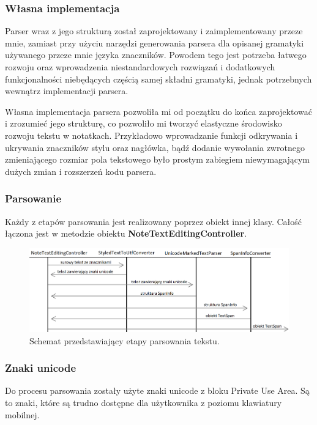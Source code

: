 \subsubsection{Własna implementacja}

Parser wraz z jego strukturą został zaprojektowany i zaimplementowany przeze mnie, zamiast przy użyciu narzędzi generowania parsera dla opisanej gramatyki używanego przeze mnie języka znaczników. Powodem tego jest potrzeba łatwego rozwoju oraz wprowadzenia niestandardowych rozwiązań i dodatkowych funkcjonalności niebędących częścią samej składni gramatyki, jednak potrzebnych wewnątrz implementacji parsera.

Własna implementacja parsera pozwoliła mi od początku do końca zaprojektować i zrozumieć jego strukturę, co pozwoliło mi tworzyć elastyczne środowisko rozwoju tekstu w notatkach. Przykładowo wprowadzanie funkcji odkrywania i ukrywania znaczników stylu oraz nagłówka, bądź dodanie wywołania zwrotnego zmieniającego rozmiar pola tekstowego było prostym zabiegiem niewymagającym dużych zmian i rozszerzeń kodu parsera.

\subsubsection{Parsowanie}

Każdy z etapów parsowania jest realizowany poprzez obiekt innej klasy. Całość łączona jest w metodzie obiektu \textbf{NoteTextEditingController}.
\newline
\begin{figure}[ht]
    \centering
    \includegraphics[width=\linewidth]{images/etapy_parsowania.png}
    \caption{Schemat przedstawiający etapy parsowania tekstu.}
    \label{fig:etapyParsowania}
\end{figure}

\subsubsection{Znaki unicode}

Do procesu parsowania zostały użyte znaki unicode z bloku Private Use Area. Są to znaki, które są trudno dostępne dla użytkownika z poziomu klawiatury mobilnej.

